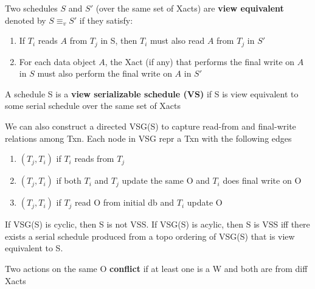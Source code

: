 \documentclass[8pt, landscape]{extarticle}
\begin{document}
\begin{multicols*}{4}
  Two schedules $S$ and $S'$ (over the same set of Xacts) are \textbf{view equivalent} denoted by $S \equiv_v S'$ if they satisfy:

  \begin{enumerate}
    \item If $T_i$ reads $A$ from $T_j$ in S, then $T_i$ must also read $A$ from $T_j$ in $S'$
    \item For each data object $A$, the Xact (if any) that performs the final write on $A$ in $S$ must also perform the final write on $A$ in $S'$
  \end{enumerate}

  A schedule S is a \textbf{view serializable schedule (VS)} if S is view equivalent to some serial schedule over the same set of Xacts

  We can also construct a directed VSG(S) to capture read-from and final-write relations among Txn. Each node in VSG repr a Txn with the following edges
  \begin{enumerate}
    \item $(T_j, T_i)$ if $T_i$ reads from $T_j$
    \item $(T_j, T_i)$ if both $T_i$ and $T_j$ update the same O and $T_i$ does final write on O
    \item $(T_j, T_i)$ if $T_j$ read O from initial db and $T_i$ update O
  \end{enumerate}
  If VSG(S) is cyclic, then S is not VSS. If VSG(S) is acylic, then S is VSS iff there exists a serial schedule produced from a topo ordering of VSG(S) that is view equivalent to S.

  Two actions on the same O \textbf{conflict} if at least one is a W and both are from diff Xacts
  

\end{multicols*}
\end{document}
